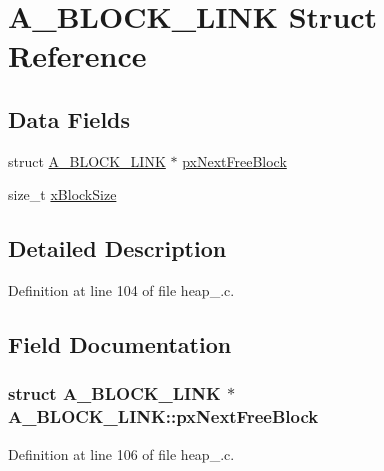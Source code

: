 \hypertarget{struct_a___b_l_o_c_k___l_i_n_k}{\section{A\-\_\-\-B\-L\-O\-C\-K\-\_\-\-L\-I\-N\-K Struct Reference}
\label{struct_a___b_l_o_c_k___l_i_n_k}
}
\subsection*{Data Fields}
\begin{DoxyCompactItemize}
\item 
struct \hyperlink{struct_a___b_l_o_c_k___l_i_n_k}{A\-\_\-\-B\-L\-O\-C\-K\-\_\-\-L\-I\-N\-K} $\ast$ \hyperlink{struct_a___b_l_o_c_k___l_i_n_k_aaef1b26e95b0b7b7ebffc91fa6ce874f}{px\-Next\-Free\-Block}
\item 
size\-\_\-t \hyperlink{struct_a___b_l_o_c_k___l_i_n_k_ad5dcf5df03d8be6186c567be9e2c657b}{x\-Block\-Size}
\end{DoxyCompactItemize}


\subsection{Detailed Description}


Definition at line 104 of file heap\-\_.\-c.



\subsection{Field Documentation}
\hypertarget{struct_a___b_l_o_c_k___l_i_n_k_aaef1b26e95b0b7b7ebffc91fa6ce874f}{
\subsubsection[{px\-Next\-Free\-Block}]{\setlength{\rightskip}{0pt plus 5cm}struct {\bf A\-\_\-\-B\-L\-O\-C\-K\-\_\-\-L\-I\-N\-K} $\ast$ A\-\_\-\-B\-L\-O\-C\-K\-\_\-\-L\-I\-N\-K\-::px\-Next\-Free\-Block}}\label{struct_a___b_l_o_c_k___l_i_n_k_aaef1b26e95b0b7b7ebffc91fa6ce874f}


Definition at line 106 of file heap\-\_.\-c.

